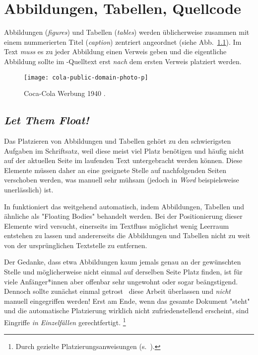 \chapter{Abbildungen, Tabellen, Quellcode}
\label{cha:Abbildungen}


Abbildungen (\emph{figures}) und Tabellen (\emph{tables}) werden
üblicherweise zusammen mit einem nummerierten Titel (\emph{caption})
zentriert angeordnet (siehe Abb.~\ref{fig:CocaCola}). Im Text \emph{muss} es
zu jeder Abbildung einen Verweis geben und die eigentliche Abbildung sollte
im \latex-Quelltext erst \emph{nach} dem ersten Verweis platziert werden.

\begin{figure}
	\centering
	\texttt{[image: cola-public-domain-photo-p]} %
	\caption{Coca-Cola Werbung 1940 \cite{CocaCola1940}.}
	\label{fig:CocaCola}
\end{figure}


\section{\emph{Let Them Float!}}

Das Platzieren von Abbildungen und Tabellen gehört zu den schwierigsten
Aufgaben im Schriftsatz, weil diese meist viel Platz benötigen und häufig
nicht auf der aktuellen Seite im laufenden Text untergebracht werden können.
Diese Elemente müssen daher an eine geeignete Stelle auf nachfolgenden Seiten
verschoben werden, was manuell sehr mühsam (jedoch in \emph{Word}
beispielsweise unerlässlich) ist.

In \latex funktioniert das weitgehend automatisch, indem Abbildungen,
Tabellen und ähnliche als "Floating Bodies" behandelt werden. Bei der
Positionierung dieser Elemente wird versucht, einerseits im Textfluss
möglichst wenig Leer\-raum entstehen zu lassen und andererseits die
Abbildungen und Tabellen nicht zu weit von der ursprünglichen Textstelle zu
entfernen.

Der Gedanke, dass etwa Abbildungen kaum jemals genau an der ge\-wünsch\-ten
Stelle und möglicherweise nicht einmal auf derselben Seite Platz finden, ist
für viele Anfänger*innen aber offenbar sehr ungewohnt oder sogar beängstigend.
Dennoch sollte zunächst einmal getrost \latex\ diese Arbeit überlassen und
\emph{nicht} manuell eingegriffen werden! Erst am Ende, wenn das gesamte
Dokument "steht" und die automatische Platzierung wirklich nicht
zufriedenstellend erscheint, sind Eingriffe \emph{in Einzelfällen} gerechtfertigt.%
\footnote{Durch gezielte Platzierungsanweisungen (s.~\cite[S.~39]{Oetiker2021}).}


